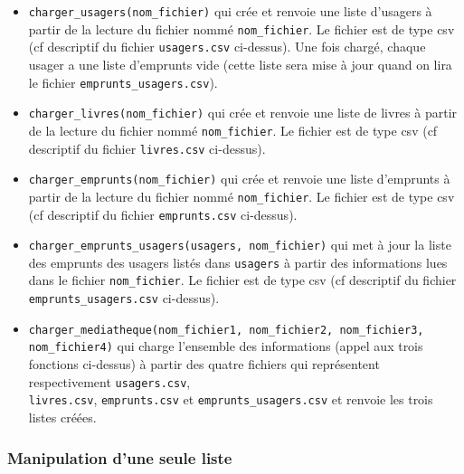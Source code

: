 \documentclass[10pt,a4paper]{sujets-exercices}
\begin{document}
\begin{itemize}
\item \texttt{charger\_usagers(nom\_fichier)} qui crée et renvoie une liste d'usagers à partir de la lecture du fichier nommé \texttt{nom\_fichier}. Le fichier est de type csv (cf descriptif du fichier \texttt{usagers.csv} ci-dessus). Une fois chargé, chaque usager a une liste d'emprunts vide (cette liste sera mise à jour quand on lira le fichier \texttt{emprunts\_usagers.csv}).

\item \texttt{charger\_livres(nom\_fichier)} qui crée et renvoie une liste de livres à partir de la lecture du fichier nommé \texttt{nom\_fichier}. Le fichier est de type csv (cf descriptif du fichier \texttt{livres.csv} ci-dessus).

\item \texttt{charger\_emprunts(nom\_fichier)} qui crée et renvoie une liste d'emprunts à partir de la lecture du fichier nommé \texttt{nom\_fichier}. Le fichier est de type csv (cf descriptif du fichier \texttt{emprunts.csv} ci-dessus).

\item \texttt{charger\_emprunts\_usagers(usagers, nom\_fichier)} qui met à jour la liste des emprunts des usagers listés dans \texttt{usagers} à partir des informations lues dans le fichier \texttt{nom\_fichier}. Le fichier est de type csv (cf descriptif du fichier \texttt{emprunts\_usagers.csv} ci-dessus).

\item \texttt{charger\_mediatheque(nom\_fichier1, nom\_fichier2, nom\_fichier3, \\nom\_fichier4)} qui charge l'ensemble des informations (appel aux trois fonctions ci-dessus) à partir des quatre fichiers qui représentent respectivement \texttt{usagers.csv}, \\ \texttt{livres.csv}, \texttt{emprunts.csv} et \texttt{emprunts\_usagers.csv} et renvoie les trois listes créées.

\end{itemize}



\subsubsection{Manipulation d'une seule liste}
\end{document}
